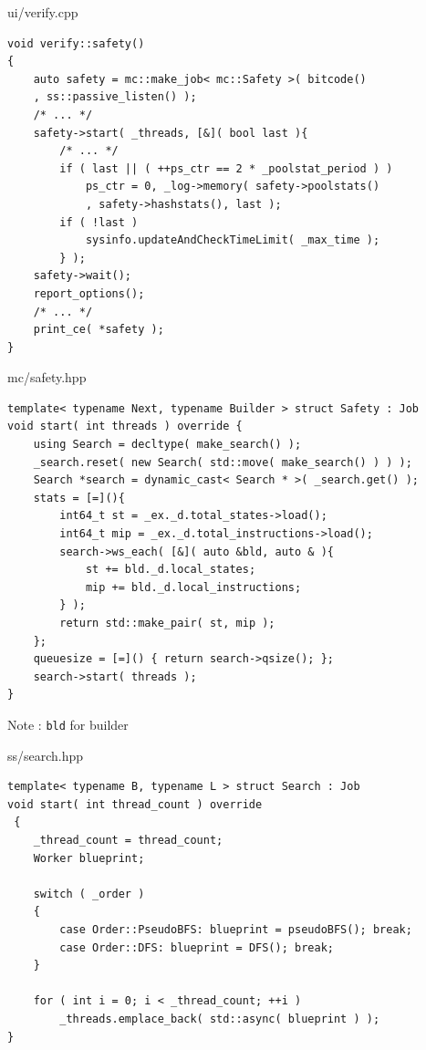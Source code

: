 \documentclass[12pt]{beamer}
\newcommand{\code}[1]{\texttt{#1}}
\begin{document}
\begin{frame}[fragile]{ui/verify.cpp}
\begin{lstlisting}[basicstyle=\footnotesize\ttfamily]
void verify::safety()
{
    auto safety = mc::make_job< mc::Safety >( bitcode()
    , ss::passive_listen() );
    /* ... */
    safety->start( _threads, [&]( bool last ){
        /* ... */
        if ( last || ( ++ps_ctr == 2 * _poolstat_period ) )
            ps_ctr = 0, _log->memory( safety->poolstats()
            , safety->hashstats(), last );
        if ( !last )
            sysinfo.updateAndCheckTimeLimit( _max_time );
        } );
    safety->wait();
    report_options();
    /* ... */
    print_ce( *safety );
}
\end{lstlisting}
\end{frame}

\begin{frame}[fragile]{mc/safety.hpp}
\begin{lstlisting}[basicstyle=\footnotesize\ttfamily]
template< typename Next, typename Builder > struct Safety : Job
void start( int threads ) override {
    using Search = decltype( make_search() );
    _search.reset( new Search( std::move( make_search() ) ) );
    Search *search = dynamic_cast< Search * >( _search.get() );
    stats = [=](){
        int64_t st = _ex._d.total_states->load();
        int64_t mip = _ex._d.total_instructions->load();
        search->ws_each( [&]( auto &bld, auto & ){
            st += bld._d.local_states;
            mip += bld._d.local_instructions;
        } );
        return std::make_pair( st, mip );
    };
    queuesize = [=]() { return search->qsize(); };
    search->start( threads );
}
\end{lstlisting}
Note : \code{bld} for builder
\end{frame}

\begin{frame}[fragile]{ss/search.hpp}
\begin{lstlisting}[basicstyle=\footnotesize\ttfamily]
template< typename B, typename L > struct Search : Job
void start( int thread_count ) override
 {
    _thread_count = thread_count;
    Worker blueprint;

    switch ( _order )
    {
        case Order::PseudoBFS: blueprint = pseudoBFS(); break;
        case Order::DFS: blueprint = DFS(); break;
    }

    for ( int i = 0; i < _thread_count; ++i )
        _threads.emplace_back( std::async( blueprint ) );
}
\end{lstlisting}
\end{frame}
\end{document}
